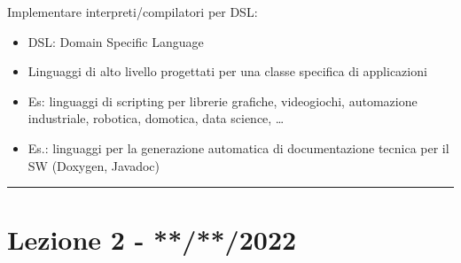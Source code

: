 \documentclass[11pt]{article}
\begin{document}
        Implementare interpreti/compilatori per DSL:
        \begin{itemize}
            \item DSL: Domain Specific Language
            \item Linguaggi di alto livello progettati per una classe specifica di applicazioni
            \item Es: linguaggi di scripting per librerie grafiche, videogiochi, automazione industriale, robotica, domotica, data science, \dots
            \item Es.: linguaggi per la generazione automatica di documentazione tecnica per il SW (Doxygen, Javadoc)
        \end{itemize}
    
\vspace{0.5cm}
\hrule
\vspace{0.5cm}

\section{Lezione 2 - **/**/2022}
\end{document}
